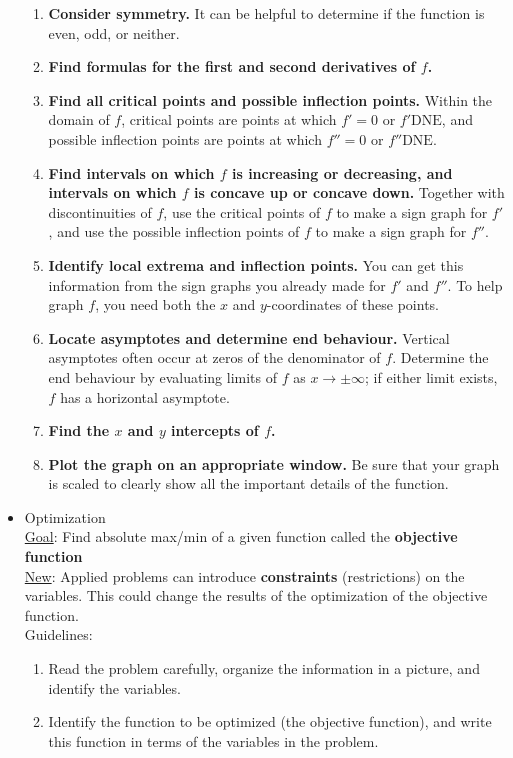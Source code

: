 \documentclass{article}
\begin{document}
\begin{itemize}
\begin{enumerate}
        \item \textbf{Consider symmetry.} It can be helpful to determine if the function is even, odd, or neither.
        \item \textbf{Find formulas for the first and second derivatives of $f$.}
        \item \textbf{Find all critical points and possible inflection points.} Within the domain of $f$, critical points are points at which $f' = 0$ or $f' \text{DNE}$, and possible inflection points are points at which $f'' = 0$ or $f'' \text{DNE}$.
        \item \textbf{Find intervals on which $f$ is increasing or decreasing, and intervals on which $f$ is concave up or concave down.} Together with discontinuities of $f$, use the critical points of $f$ to make a sign graph for $f'$, and use the possible inflection points of $f$ to make a sign graph for $f''$.
        \item \textbf{Identify local extrema and inflection points.} You can get this information from the sign graphs you already made for $f'$ and $f''$. To help graph $f$, you need both the $x$ and $y$-coordinates of these points.
        \item \textbf{Locate asymptotes and determine end behaviour.} Vertical asymptotes often occur at zeros of the denominator of $f$. Determine the end behaviour by evaluating limits of $f$ as $x \to \pm \infty$; if either limit exists, $f$ has a horizontal asymptote.
        \item \textbf{Find the $x$ and $y$ intercepts of $f$.}
        \item \textbf{Plot the graph on an appropriate window.} Be sure that your graph is scaled to clearly show all the important details of the function.
    \end{enumerate}
    \item Optimization \\
    \underline{Goal}: Find absolute max/min of a given function called the \textbf{objective function} \\
    \underline{New}: Applied problems can introduce \textbf{constraints} (restrictions) on the variables. This could change the results of the optimization of the objective function. \\
    Guidelines:
    \begin{enumerate}
        \item Read the problem carefully, organize the information in a picture, and identify the variables.
        \item Identify the function to be optimized (the objective function), and write this function in terms of the variables in the problem.

\end{enumerate}
\end{itemize}
\end{document}
